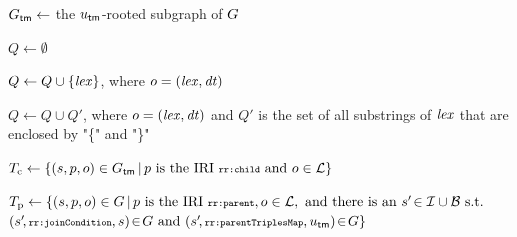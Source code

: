    \DontPrintSemicolon
	\caption{\textsc{ExtractQueries} - extract query expressions from triples maps.}
	\label{alg:query_extraction}


		$G_\mathsf{tm} \gets$ the $u_\mathsf{tm}$-rooted subgraph of $G$ 
		\label{line:query_extraction:subgraph}

        $Q \gets \emptyset$ 

        {
		    $Q \gets Q \cup \{ \mathit{lex} \}$, where $o = (\mathit{lex},\mathit{dt})$ \;
        }
        \label{line:query_extraction:from_references_end}

        {
			$Q \gets Q \cup Q'\!$, where $o = (\mathit{lex},\mathit{dt})$ and $Q'$
				is the set of
			all substrings of $\mathit{lex}$ that \hspace*{16mm} are enclosed by "\{" and "\}" \;
        }
        \label{line:query_extraction:from_templates_end}
		
		$T_\textrm{c} \gets \{ (s,p,o) \in G_\mathsf{tm} \, | \, p \text{ is the IRI } \texttt{\scriptsize rr:child} \text{ and } o \in \mathcal{L} \}$ \;
		\label{line:query_extraction:from_joins_begin}

		$T_\textrm{p} \gets \{(s,p,o) \in G \, | \, p \text{ is the IRI } \texttt{\scriptsize rr:parent}, o \in \mathcal{L}, \text{ and there is an } s'\! \in \mathcal{I}\cup\mathcal{B} \text{ s.t.}$ \hspace*{26mm} $(s'\!, \texttt{\scriptsize rr:joinCondition}, s) \!\in\! G \text{ and } (s'\!, \texttt{\scriptsize rr:parentTriplesMap}, u_\textsf{tm}) \!\in\! G \}$ \;

